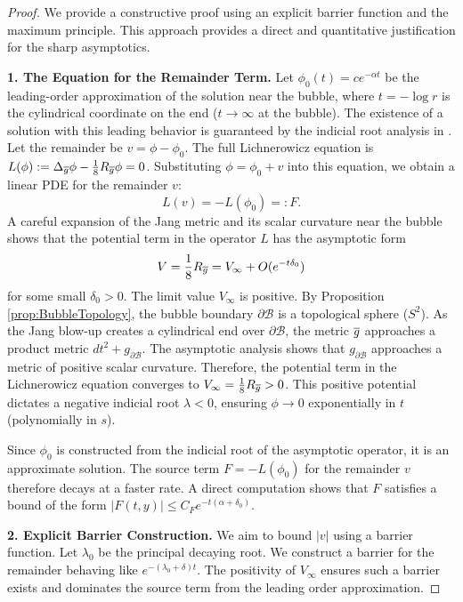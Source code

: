 \begin{proof}
We provide a constructive proof using an explicit barrier function and the maximum principle. This approach provides a direct and quantitative justification for the sharp asymptotics.

\textbf{1. The Equation for the Remainder Term.}
Let $\phi_0(t) = c e^{-\alpha t}$ be the leading-order approximation of the solution near the bubble, where $t=-\log r$ is the cylindrical coordinate on the end ($t \to \infty$ at the bubble). The existence of a solution with this leading behavior is guaranteed by the indicial root analysis in . Let the remainder be $v = \phi - \phi_0$. The full Lichnerowicz equation is $L(\phi) := \Delta_{\overline{g}}\phi - \frac{1}{8}R_{\overline{g}}\phi = 0$.
Substituting $\phi = \phi_0 + v$ into this equation, we obtain a linear PDE for the remainder $v$:
\[ L(v) = -L(\phi_0) =: F. \]
A careful expansion of the Jang metric and its scalar curvature near the bubble shows that the potential term in the operator $L$ has the asymptotic form
\[ V = \frac{1}{8}R_{\overline{g}} = V_\infty + O(e^{-t\delta_0}) \]
for some small $\delta_0 > 0$.
The limit value $V_\infty$ is positive. By Proposition \ref{prop:BubbleTopology}, the bubble boundary $\partial \mathcal{B}$ is a topological sphere ($S^2$). As the Jang blow-up creates a cylindrical end over $\partial\mathcal{B}$, the metric $\overline{g}$ approaches a product metric $dt^2 + g_{\partial\mathcal{B}}$. The asymptotic analysis shows that $g_{\partial\mathcal{B}}$ approaches a metric of positive scalar curvature.
Therefore, the potential term in the Lichnerowicz equation converges to $V_\infty = \frac{1}{8}R_{\overline{g}} > 0$. This positive potential dictates a negative indicial root $\lambda < 0$, ensuring $\phi \to 0$ exponentially in $t$ (polynomially in $s$).

Since $\phi_0$ is constructed from the indicial root of the asymptotic operator, it is an approximate solution. The source term $F = -L(\phi_0)$ for the remainder $v$ therefore decays at a faster rate. A direct computation shows that $F$ satisfies a bound of the form $|F(t,y)| \le C_F e^{-t(\alpha+\delta_0)}$.

\textbf{2. Explicit Barrier Construction.}
We aim to bound $|v|$ using a barrier function. Let $\lambda_0$ be the principal decaying root. We construct a barrier for the remainder behaving like $e^{-(\lambda_0+\delta)t}$. The positivity of $V_\infty$ ensures such a barrier exists and dominates the source term from the leading order approximation.


\end{proof}
